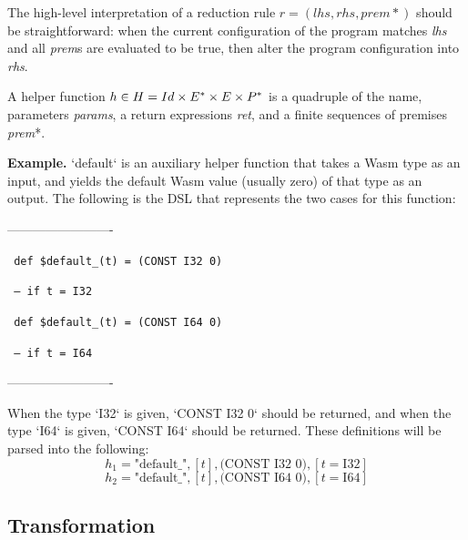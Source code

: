 The high-level interpretation of a reduction rule $r = (lhs, rhs, prem*)$ should be straightforward:
when the current configuration of the program matches \textit{lhs} and all \textit{prem}s are
evaluated to be true, then alter the program configuration into \textit{rhs}.

A helper function $h \in H = Id \times E^\ast \times E \times P^\ast$ is a quadruple of
the name, parameters \textit{params}, a return expressions \textit{ret}, and a finite sequences of premises \textit{prem}*.

\textbf{Example.} `default` is an auxiliary helper function that takes a Wasm type as an input, and yields
the default Wasm value (usually zero) of that type as an output. The following is the
DSL that represents the two cases for this function:


-------------------------

\texttt{
def \$default\_(t) = (CONST I32 0)
}

\texttt{
-- if t = I32
}

\texttt{
def \$default\_(t) = (CONST I64 0)
}

\texttt{
-- if t = I64
}

-------------------------

When the type `I32` is given, `CONST I32 0` should be returned,
and when the type `I64` is given, `CONST I64` should be returned.
These definitions will be parsed into the following:
\[h_1=\text{"default\_"}, [t], \text{(CONST I32 0)}, [t = \text{I32}]\]
\[h_2=\text{"default\_"}, [t], \text{(CONST I64 0)}, [t = \text{I64}]\]


\subsection{Transformation}

